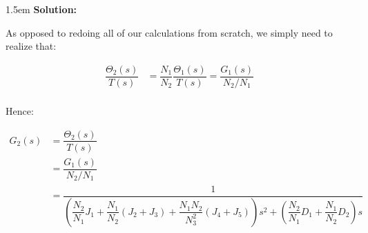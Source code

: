 \documentclass{article}
\newenvironment{solution}{
	\vspace{.5em}
	\par
	\begin{adjustwidth}{1.5em}{}
	\textbf{{Solution:}}
	\par
	\vspace{.5em}
}{
	\vspace{1em}
	\end{adjustwidth}
}
\begin{document}
\begin{solution}
	As opposed to redoing all of our calculations from scratch, we simply need to realize that:

	\begin{align*}
		\dfrac{\Theta_2(s)}{T(s)} &= \dfrac{N_1}{N_2} \dfrac{\Theta_1(s)}{T(s)} = \dfrac{G_1(s)}{N_2 / N_1} \\
	\end{align*}

	Hence:

	\begin{align*}
		G_2(s) &= \dfrac{\Theta_2(s)}{T(s)} \\
			&= \dfrac{G_1(s)}{N_2 / N_1} \\
			&= \dfrac{1}{\left(\dfrac{N_2}{N_1} J_1 + \dfrac{N_1}{N_2} (J_2 + J_3) + \dfrac{N_1 N_2}{N_3^2} (J_4 + J_5)\right) s^2 + \left(\dfrac{N_2}{N_1} D_1 + \dfrac{N_1}{N_2} D_2\right) s}
	\end{align*}
\end{solution}
\end{document}
